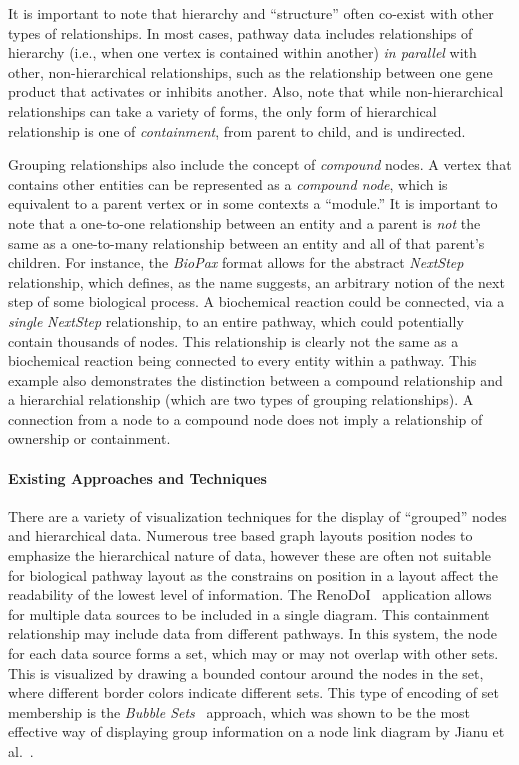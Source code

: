 \documentclass[twocolumn]{bmcart}%
\begin{document}
It is important to note that hierarchy and ``structure'' often co-exist with other types of relationships.
In most cases, pathway data includes relationships of hierarchy (i.e., when one vertex is contained within another) \textit{in parallel} with other, non-hierarchical relationships, such as the relationship between one gene product that activates or inhibits another.
Also, note that while non-hierarchical relationships can take a variety of forms, the only form of hierarchical relationship is one of \textit{containment}, from parent to child, and is undirected.

Grouping relationships also include the concept of \textit{compound} nodes.
A vertex that contains other entities can be represented as a \textit{compound node}, which is equivalent to a parent vertex or in some contexts a ``module.''
It is important to note that a one-to-one relationship between an entity and a parent is \textit{not} the same as a one-to-many relationship between an entity and all of that parent's children.
For instance, the \textit{BioPax} format allows for the abstract \emph{NextStep} relationship, which defines, as the name suggests, an arbitrary notion of the next step of some biological process.
A biochemical reaction could be connected, via a \textit{single} \emph{NextStep} relationship, to an entire pathway, which could potentially contain thousands of nodes.
This relationship is clearly not the same as a biochemical reaction being connected to every entity within a pathway.
This example also demonstrates the distinction between a compound relationship and a hierarchial relationship (which are two types of grouping relationships).
A connection from a node to a compound node does not imply a relationship of ownership or containment.

\paragraph*{Existing Approaches and Techniques}

There are a variety of visualization techniques for the display of ``grouped'' nodes and hierarchical data.
Numerous tree based graph layouts position nodes to emphasize the hierarchical nature of data, however these are often not suitable for biological pathway layout as the constrains on position in a layout affect the readability of the lowest level of information.
The RenoDoI~\cite{Vehlow2015} application allows for multiple data sources to be included in a single diagram.
This containment relationship may include data from different pathways.
In this system, the node for each data source forms a set, which may or may not overlap with other sets.
This is visualized by drawing a bounded contour around the nodes in the set, where different border colors indicate different sets.
This type of encoding of set membership is the \textit{Bubble Sets}~\cite{Collins2009} approach, which was shown to be the most effective way of displaying group information on a node link diagram by Jianu et al.~\cite{Jianu2014}.
\end{document}

